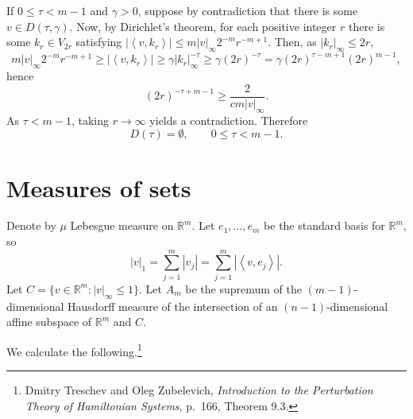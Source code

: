 \documentclass{article}
\newcommand{\inner}[2]{\left\langle #1, #2 \right\rangle}
\theoremstyle{definition}
\begin{document}
If $0 \leq \tau<m-1$ and $\gamma>0$,
suppose by contradiction that there is some $v \in D(\tau,\gamma)$.
Now, by Dirichlet's theorem, for each positive integer $r$ there is some
$k_r \in V_{2r}$ satisfying $|\inner{v}{k_r}| \leq m |v|_\infty 2^{-m} r^{-m+1}$. 
Then, as $|k_r|_\infty \leq 2r$,
\[
m |v|_\infty 2^{-m} r^{-m+1} \geq |\inner{v}{k_r}| \geq  \gamma |k_r|_\infty^{-\tau}
\geq\gamma (2r)^{-\tau}
=\gamma (2r)^{\tau-m+1} (2r)^{m-1},
\]
hence
\[
(2r)^{-\tau+m-1} \geq \frac{2}{cm|v|_\infty}.
\]
As $\tau<m-1$, taking $r \to \infty$ yields a contradiction. Therefore
\[
D(\tau) = \emptyset, \qquad 0 \leq \tau<m-1.
\]



\section{Measures of sets}
Denote by $\mu$ Lebesgue measure on $\mathbb{R}^m$.
Let $e_1,\ldots,e_m$ be the standard basis for $\mathbb{R}^m$, so
\[
|v|_1 = \sum_{j=1}^m |v_j| = \sum_{j=1}^m |\inner{v}{e_j}|.
\]
Let $C=\{v \in \mathbb{R}^m: |v|_\infty \leq 1\}$. 
Let $A_m$ be the supremum of the  $(m-1)$-dimensional Hausdorff measure of
the intersection of an $(n-1)$-dimensional affine subspace of $\mathbb{R}^m$ and $C$.

We calculate the following.\footnote{Dmitry Treschev and Oleg Zubelevich, {\em Introduction
to the Perturbation Theory of Hamiltonian Systems},
p.~166, Theorem 9.3.}
\end{document}
